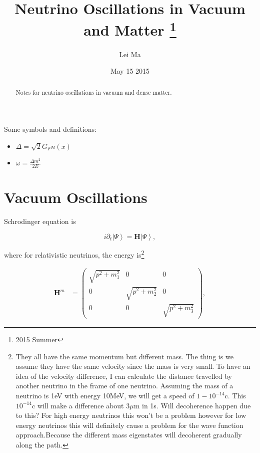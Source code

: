 \documentclass{tufte-handout}
\title{Neutrino Oscillations in Vacuum and Matter \thanks{2015 Summer}}
\author[Lei Ma]{Lei Ma}
\date{May 15 2015}  %
\newcommand{\ket}[1]{\left| #1\right\rangle}
\begin{document}
\maketitle%

\begin{abstract}
\noindent Notes for neutrino oscillations in vacuum and dense matter.
\end{abstract}



Some symbols and definitions:
\begin{itemize}
\item 
$\Delta = \sqrt{2} G_F n(x) $
\item
$\omega = \frac{\Delta m^2}{2E}$
\end{itemize}




\section{Vacuum Oscillations}

Schrodinger equation is

\begin{equation}
i\partial_t \ket{\Psi} = \mathbf H \ket{\Psi},
\end{equation}

where for relativistic neutrinos, the energy is\footnote{They all have the same momentum but different mass. The thing is we assume they have the same velocity since the mass is very small. To have an idea of the velocity difference, I can calculate the distance travelled by another neutrino in the frame of one neutrino.\newline
Assuming the mass of a neutrino is 1eV with energy 10MeV, we will get a speed of $1-10^{-14}$c. This $10^{-14}$c will make a difference about $3\mu\mathrm{ m}$ in 1s.
 \newline Will decoherence happen due to this? For high energy neutrinos this won't be a problem however for low energy neutrinos this will definitely cause a problem for the wave function approach.Because the different mass eigenstates will decoherent gradually along the path.}

\begin{align*}
\mathbf H^m &= \begin{pmatrix}\sqrt{p^2 + m_1^2} & 0 & 0 \\ 0& \sqrt{p^2 + m_2^2} & 0 \\ 0 & 0 & \sqrt{p^2 + m_3^2}  \end{pmatrix},
\end{align*}
\end{document}
